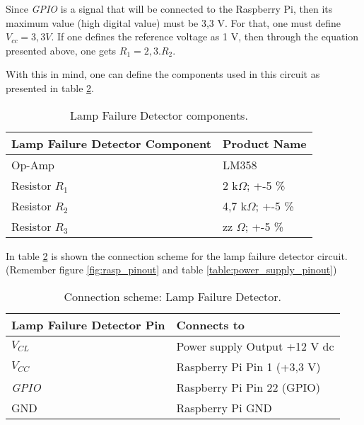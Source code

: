 Since \textit{GPIO} is a signal that will be connected to the Raspberry Pi, then its maximum value (high digital value) must be 3,3 V. For that, one must define $V_{cc} = 3,3 V$. If one defines the reference voltage as 1 V, then through the equation presented above, one gets $R_1 = 2,3.R_2$.

With this in mind, one can define the components used in this circuit as presented in table \ref{table:connect_lampfail}.

\begin{table}[H]
	\centering
	\begin{tabular}{|m{5cm}|m{6cm}|}
		\hline
		\textbf{Lamp Failure Detector Component} & \textbf{Product Name}
		\\\hline\hline
		
		Op-Amp & LM358
		\\\hline
		Resistor \(R_{1}\) & 2 k$\Omega$; +-5 \%
		\\\hline
		Resistor \(R_{2}\) & 4,7 k$\Omega$; +-5 \%
		\\\hline
		Resistor \(R_{3}\) & zz $\Omega$; +-5 \%
		\\\hline
	\end{tabular}
	\caption{Lamp Failure Detector components.}
	\label{table:lampFailure_components}
\end{table}

In table \ref{table:connect_lampfail} is shown the connection scheme for the lamp failure detector circuit. (Remember figure \ref{fig:rasp_pinout} and table \ref{table:power_supply_pinout})

\begin{table}[H]
	\centering
	\begin{tabular}{|m{5cm}|m{6cm}|}
		\hline
		\textbf{Lamp Failure Detector Pin} & \textbf{Connects to}
		\\\hline\hline
		
		\(V_{CL}\) & Power supply Output +12 V \ac{dc}
		\\\hline
		
		\(V_{CC}\) & Raspberry Pi Pin 1 (+3,3 V)
		\\\hline
		
		\textit{GPIO} & Raspberry Pi Pin 22 (GPIO)
		\\\hline
		
		GND & Raspberry Pi GND
		\\\hline
	\end{tabular}
	
	\caption{Connection scheme: Lamp Failure Detector.}
	\label{table:connect_lampfail}
\end{table}

